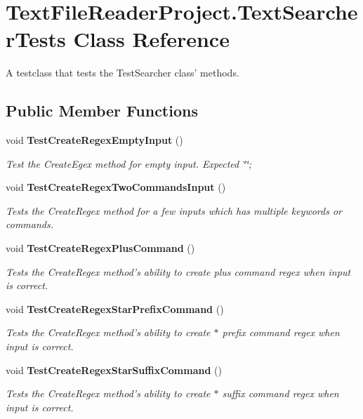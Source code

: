 \section{Text\+File\+Reader\+Project.\+Text\+Searcher\+Tests Class Reference}
\label{class_text_file_reader_project_1_1_text_searcher_tests}


A testclass that tests the Test\+Searcher class' methods.  


\subsection*{Public Member Functions}
\begin{DoxyCompactItemize}
\item 
void {\bf Test\+Create\+Regex\+Empty\+Input} ()
\begin{DoxyCompactList}\small\item\em Test the Create\+Egex method for empty input. Expected \char`\"{}\char`\"{}; \end{DoxyCompactList}\item 
void {\bf Test\+Create\+Regex\+Two\+Commands\+Input} ()
\begin{DoxyCompactList}\small\item\em Tests the Create\+Regex method for a few inputs which has multiple keywords or commands. \end{DoxyCompactList}\item 
void {\bf Test\+Create\+Regex\+Plus\+Command} ()
\begin{DoxyCompactList}\small\item\em Tests the Create\+Regex method's ability to create plus command regex when input is correct. \end{DoxyCompactList}\item 
void {\bf Test\+Create\+Regex\+Star\+Prefix\+Command} ()
\begin{DoxyCompactList}\small\item\em Tests the Create\+Regex method's ability to create $\ast$ prefix command regex when input is correct. \end{DoxyCompactList}\item 
void {\bf Test\+Create\+Regex\+Star\+Suffix\+Command} ()
\begin{DoxyCompactList}\small\item\em Tests the Create\+Regex method's ability to create $\ast$ suffix command regex when input is correct. \end{DoxyCompactList}\item 

\end{DoxyCompactItemize}
